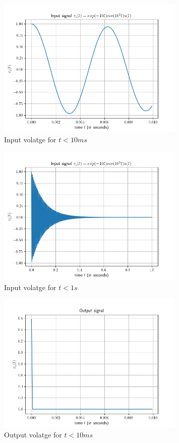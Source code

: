 \documentclass[12pt, a4paper]{article}
\begin{document}
\begin{figure}[H]
\centering
\includegraphics[width=0.8\textwidth]{q4Input3.png}
\caption{Input volatge for $t < 10 ms$}
\end{figure}

\begin{figure}[H]
\centering
\includegraphics[width=0.8\textwidth]{q4Input4.png}
\caption{Input volatge for $t < 1 s$}
\end{figure}

\begin{figure}[H]
\centering
\includegraphics[width=0.8\textwidth]{q4Output3.png}
\caption{Output volatge for $t < 10 ms$}
\end{figure}
\end{document}

